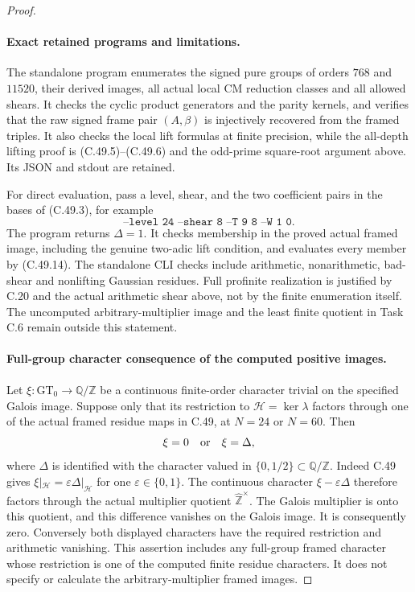 \begin{proof}
\paragraph{Exact retained programs and limitations.}
The standalone program 
enumerates the signed pure groups of orders $768$ and $11520$,
their derived images, all actual local CM reduction classes and all
allowed shears. It checks the cyclic product generators and the
parity kernels, and verifies that the raw signed frame pair
$(A,\beta)$ is injectively recovered from the framed triples.
It also checks the local lift formulas at finite precision, while
the all-depth lifting proof is (C.49.5)--(C.49.6) and the odd-prime
square-root argument above. Its JSON and stdout are retained.

For direct evaluation, pass a level, shear, and the two coefficient
pairs in the bases of (C.49.3), for example
\[
 \texttt{--level 24 --shear 8 --T 9 8 --W 1 0}.
\]
The program returns $\Delta=1$. It checks membership in the proved
actual framed image, including the genuine two-adic lift condition,
and evaluates every member by (C.49.14). The standalone CLI checks
include arithmetic, nonarithmetic, bad-shear and nonlifting Gaussian
residues. Full profinite realization is justified by C.20 and the
actual arithmetic shear above, not by the finite enumeration itself.
The uncomputed arbitrary-multiplier image and the least finite
quotient in Task C.6 remain outside this statement.
\paragraph{Full-group character consequence of the computed positive images.}
Let $\xi:\widehat{\mathrm{GT}}_0\to\mathbb Q/\mathbb Z$ be a
continuous finite-order character trivial on the specified Galois
image. Suppose only that its restriction to
$\mathcal H=\ker\lambda$ factors through one of the actual framed
residue maps in C.49, at $N=24$ or $N=60$. Then
\[
                           \xi=0\quad\hbox{or}\quad\xi=\Delta,
\]
where $\Delta$ is identified with the character valued in
$\{0,1/2\}\subset\mathbb Q/\mathbb Z$.
Indeed C.49 gives $\xi|_{\mathcal H}=\varepsilon\Delta|_{\mathcal H}$
for one $\varepsilon\in\{0,1\}$. The continuous character
$\xi-\varepsilon\Delta$ therefore factors through the actual
multiplier quotient $\widehat{\mathbb Z}^{\times}$. The Galois
multiplier is onto this quotient, and this difference vanishes on
the Galois image. It is consequently zero. Conversely both displayed
characters have the required restriction and arithmetic vanishing.
This assertion includes any full-group framed character whose
restriction is one of the computed finite residue characters. It does
not specify or calculate the arbitrary-multiplier framed images.
\end{proof}

